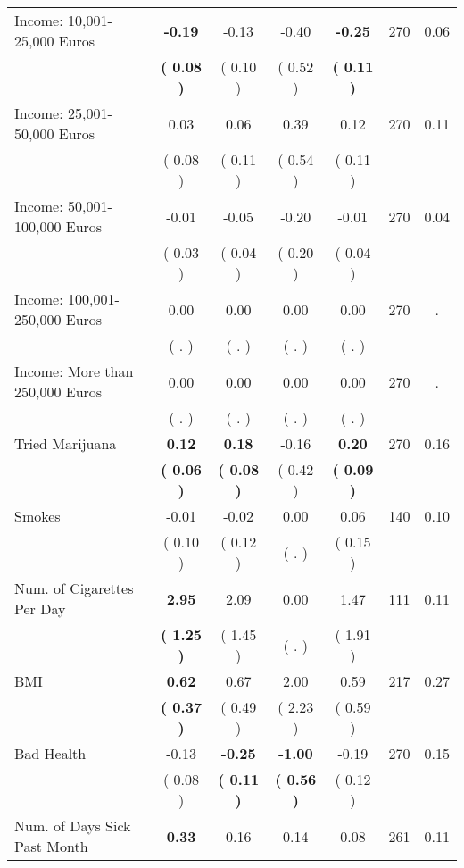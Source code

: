 \begin{tabular}{lcccccc}
Income: 10,001-25,000 Euros & \textbf{    -0.19} &     -0.13 &     -0.40 & \textbf{    -0.25} & 270 &      0.06 \\ 
 & \textbf{(     0.08 )} & (     0.10 ) & (     0.52 ) & \textbf{(     0.11 )} & \\
Income: 25,001-50,000 Euros &      0.03 &      0.06 &      0.39 &      0.12 & 270 &      0.11 \\ 
 & (     0.08 ) & (     0.11 ) & (     0.54 ) & (     0.11 ) & \\
Income: 50,001-100,000 Euros &     -0.01 &     -0.05 &     -0.20 &     -0.01 & 270 &      0.04 \\ 
 & (     0.03 ) & (     0.04 ) & (     0.20 ) & (     0.04 ) & \\
Income: 100,001-250,000 Euros &      0.00 &      0.00 &      0.00 &      0.00 & 270 &         . \\ 
 & (        . ) & (        . ) & (        . ) & (        . ) & \\
Income: More than 250,000 Euros &      0.00 &      0.00 &      0.00 &      0.00 & 270 &         . \\ 
 & (        . ) & (        . ) & (        . ) & (        . ) & \\
Tried Marijuana & \textbf{     0.12} & \textbf{     0.18} &     -0.16 & \textbf{     0.20} & 270 &      0.16 \\ 
 & \textbf{(     0.06 )} & \textbf{(     0.08 )} & (     0.42 ) & \textbf{(     0.09 )} & \\
Smokes &     -0.01 &     -0.02 &      0.00 &      0.06 & 140 &      0.10 \\ 
 & (     0.10 ) & (     0.12 ) & (        . ) & (     0.15 ) & \\
Num. of Cigarettes Per Day & \textbf{     2.95} &      2.09 &      0.00 &      1.47 & 111 &      0.11 \\ 
 & \textbf{(     1.25 )} & (     1.45 ) & (        . ) & (     1.91 ) & \\
BMI & \textbf{     0.62} &      0.67 &      2.00 &      0.59 & 217 &      0.27 \\ 
 & \textbf{(     0.37 )} & (     0.49 ) & (     2.23 ) & (     0.59 ) & \\
Bad Health &     -0.13 & \textbf{    -0.25} & \textbf{    -1.00} &     -0.19 & 270 &      0.15 \\ 
 & (     0.08 ) & \textbf{(     0.11 )} & \textbf{(     0.56 )} & (     0.12 ) & \\
Num. of Days Sick Past Month & \textbf{     0.33} &      0.16 &      0.14 &      0.08 & 261 &      0.11 \\ 

\end{tabular}
